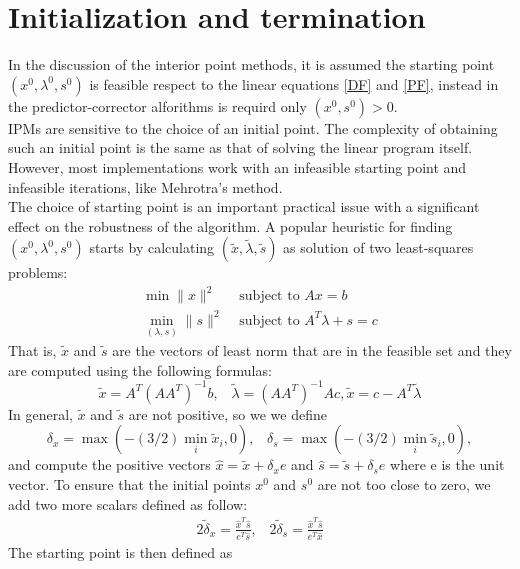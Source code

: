 \documentclass[a4paper,10 pt,titlepage,twoside]{book}
\theoremstyle{plain}
\theoremstyle{definition}
\theoremstyle{remark}
\begin{document}
\section*{Initialization and termination}
In the discussion of the interior point methods, it is assumed the starting point $(x^{0}, \lambda^{0}, s^{0})$ is feasible respect to the linear equations \ref{DF} and \ref{PF}, instead in the predictor-corrector alforithms is requird only $(x^{0},s^{0})>0$.\\
IPMs are sensitive to the choice of an initial point.
The complexity of obtaining such an initial point is the same as that of solving the
linear program itself. However, most implementations work with an infeasible starting point and infeasible iterations, like Mehrotra's method.\\
The choice of starting point is an important practical issue with a significant effect on the robustness of the algorithm. A popular heuristic for finding $(x^{0}, \lambda^{0}, s^{0})$ starts by calculating $(\tilde{x}, \tilde{\lambda}, \tilde{s})$ as solution of two least-squares problems:
\begin{align*}
\min \lVert x \rVert ^{2} &\text{ subject to }Ax = b\\
\min\limits_{(\lambda,s)} \lVert s \rVert ^{2} &\text{ subject to } A^{T}\lambda +s = c
\end{align*}
That is, $\tilde{x}$ and $\tilde{s}$ are the vectors of least norm that are in the feasible set and they are computed using the following formulas:
\begin{equation*}
\tilde{x} = A^{T}(AA^{T})^{-1}b,\;\;\;\tilde{\lambda}=(AA^{T})^{-1}Ac, \tilde{x} = c- A^{T}\tilde{\lambda}
\end{equation*}
In general, $\tilde{x}$ and $\tilde{s}$ are not positive, so we we define
\begin{equation*}
\delta_{x} = \max(-(3/2)\min\limits_{i}\tilde{x}_{i},0),\;\;\; \delta_{s} = \max(-(3/2)\min\limits_{i}\tilde{s}_{i},0),
\end{equation*}
and compute the positive vectors $\hat{x}= \tilde{x}+\delta_{x}e$ and $\hat{s}= \tilde{s}+\delta_{s}e$ where e is the unit vector. To ensure that the initial points $x^{0}$ and $s^{0}$ are not too close to zero, we add two more scalars defined as follow:
\begin{align*}
2\tilde{\delta}_{x}= \frac{\hat{x}^{T}\hat{s}}{e^{T}\hat{s}},\;\;\;2\tilde{\delta}_{s} = \frac{\hat{x}^{T}\hat{s}}{e^{T}\hat{x}}
\end{align*}
The starting point is then defined as 
\end{document}
